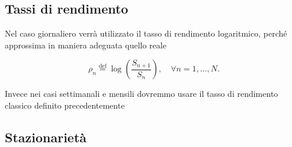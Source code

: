 \documentclass[compress]{beamer}
\begin{document}
\subsection{Tassi di rendimento}
\begin{frame}{\subsecname}
	Nel caso giornaliero verrà utilizzato il tasso di rendimento logaritmico, perché approssima in maniera adeguata quello reale

	\[
		\rho_n \overset{\text{def}}{=} \log \left( \frac{S_{n+1}}{S_n} \right), \quad \forall n = 1, \dots, N.
	\]

    Invece nei casi settimanali e mensili dovremmo usare il tasso di rendimento classico definito precedentemente
\end{frame}

\subsection{Stazionarietà}
\end{document}
